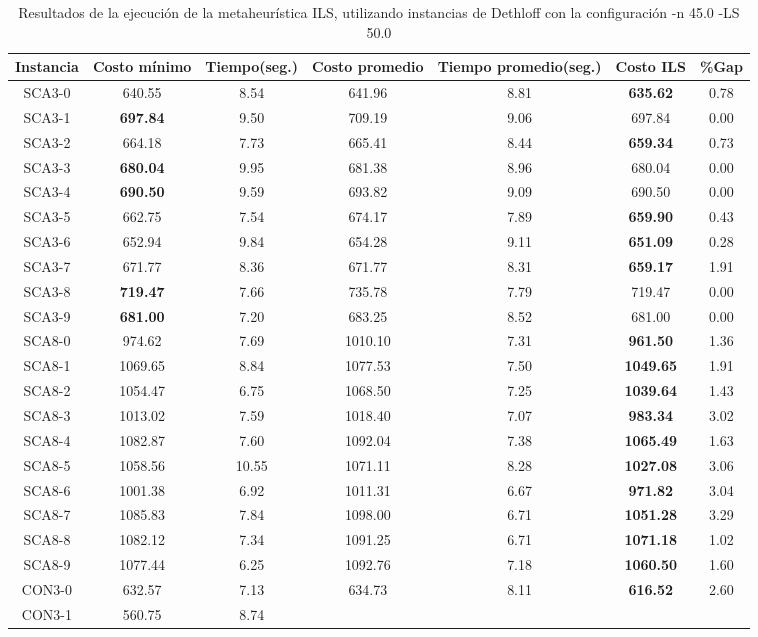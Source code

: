 \begin{table}[ht]
\caption{Resultados de la ejecución de la metaheurística ILS, utilizando instancias de Dethloff con la configuración -n 45.0 -LS 50.0}
\centering
\small
\begin{tabular}{c c c c c c c}
\hline\hline
Instancia & Costo mínimo & Tiempo(seg.) & Costo promedio & Tiempo promedio(seg.) & Costo ILS & \%Gap \\ [0.5ex]
\hline
SCA3-0 & 640.55 & 8.54 & 
641.96 & 8.81 & \bf{635.62} & 
0.78\\SCA3-1 & \bf{697.84} & 9.50 & 
709.19 & 9.06 & 697.84 & 0.00\\
SCA3-2 & 664.18 & 7.73 & 
665.41 & 8.44 & \bf{659.34} & 
0.73\\SCA3-3 & \bf{680.04} & 9.95 & 
681.38 & 8.96 & 680.04 & 0.00\\
SCA3-4 & \bf{690.50} & 9.59 & 
693.82 & 9.09 & 690.50 & 0.00\\
SCA3-5 & 662.75 & 7.54 & 
674.17 & 7.89 & \bf{659.90} & 
0.43\\SCA3-6 & 652.94 & 9.84 & 
654.28 & 9.11 & \bf{651.09} & 
0.28\\SCA3-7 & 671.77 & 8.36 & 
671.77 & 8.31 & \bf{659.17} & 
1.91\\SCA3-8 & \bf{719.47} & 7.66 & 
735.78 & 7.79 & 719.47 & 0.00\\
SCA3-9 & \bf{681.00} & 7.20 & 
683.25 & 8.52 & 681.00 & 0.00\\
SCA8-0 & 974.62 & 7.69 & 
1010.10 & 7.31 & \bf{961.50} & 
1.36\\SCA8-1 & 1069.65 & 8.84 & 
1077.53 & 7.50 & \bf{1049.65} & 
1.91\\SCA8-2 & 1054.47 & 6.75 & 
1068.50 & 7.25 & \bf{1039.64} & 
1.43\\SCA8-3 & 1013.02 & 7.59 & 
1018.40 & 7.07 & \bf{983.34} & 
3.02\\SCA8-4 & 1082.87 & 7.60 & 
1092.04 & 7.38 & \bf{1065.49} & 
1.63\\SCA8-5 & 1058.56 & 10.55 & 
1071.11 & 8.28 & \bf{1027.08} & 
3.06\\SCA8-6 & 1001.38 & 6.92 & 
1011.31 & 6.67 & \bf{971.82} & 
3.04\\SCA8-7 & 1085.83 & 7.84 & 
1098.00 & 6.71 & \bf{1051.28} & 
3.29\\SCA8-8 & 1082.12 & 7.34 & 
1091.25 & 6.71 & \bf{1071.18} & 
1.02\\SCA8-9 & 1077.44 & 6.25 & 
1092.76 & 7.18 & \bf{1060.50} & 
1.60\\CON3-0 & 632.57 & 7.13 & 
634.73 & 8.11 & \bf{616.52} & 
2.60\\CON3-1 & 560.75 & 8.74 & 

\end{tabular}
\end{table}
